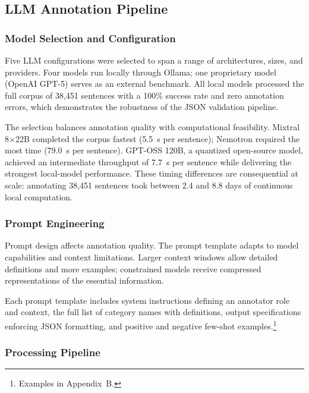 \documentclass[12pt]{article}
\begin{document}
\subsection{LLM Annotation Pipeline}

\subsubsection{Model Selection and Configuration}

Five LLM configurations were selected to span a range of architectures, sizes, and providers. Four models run locally through Ollama; one proprietary model (OpenAI GPT-5) serves as an external benchmark. All local models processed the full corpus of 38,451 sentences with a 100\% success rate and zero annotation errors, which demonstrates the robustness of the JSON validation pipeline.



The selection balances annotation quality with computational feasibility. Mixtral 8$\times$22B completed the corpus fastest (5.5~s per sentence); Nemotron required the most time (79.0~s per sentence). GPT-OSS 120B, a quantized open-source model, achieved an intermediate throughput of 7.7~s per sentence while delivering the strongest local-model performance. These timing differences are consequential at scale: annotating 38,451 sentences took between 2.4 and 8.8 days of continuous local computation.

\subsubsection{Prompt Engineering}

Prompt design affects annotation quality. The prompt template adapts to model capabilities and context limitations. Larger context windows allow detailed definitions and more examples; constrained models receive compressed representations of the essential information.

Each prompt template includes system instructions defining an annotator role and context, the full list of category names with definitions, output specifications enforcing JSON formatting, and positive and negative few-shot examples.\footnote{Examples in Appendix~B.}

\subsubsection{Processing Pipeline}
\end{document}
